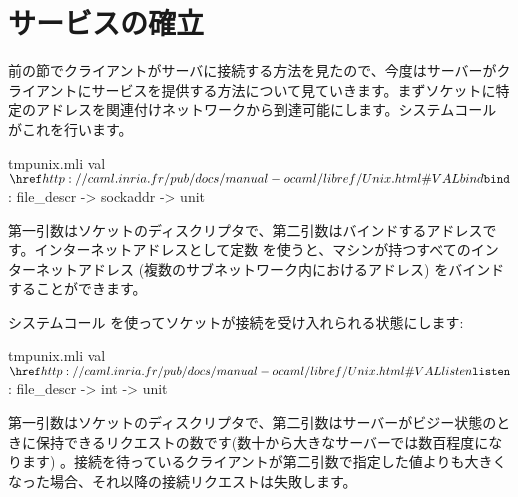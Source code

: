 \section{\label{sec/service}サービスの確立}

前の節でクライアントがサーバに接続する方法を見たので、今度はサーバーがクライアントにサービスを提供する方法について見ていきます。まずソケットに特定のアドレスを関連付けネットワークから到達可能にします。システムコール  がこれを行います。
%
\begin{listingcodefile}{tmpunix.mli}
val $\libvalue{Unix}{bind}$ : file_descr -> sockaddr -> unit
\end{listingcodefile}
%
第一引数はソケットのディスクリプタで、第二引数はバインドするアドレスです。インターネットアドレスとして定数  を使うと、マシンが持つすべてのインターネットアドレス (複数のサブネットワーク内におけるアドレス) をバインドすることができます。

システムコール  を使ってソケットが接続を受け入れられる状態にします:
%
\begin{listingcodefile}{tmpunix.mli}
val $\libvalue{Unix}{listen}$ : file_descr -> int -> unit
\end{listingcodefile}
%
第一引数はソケットのディスクリプタで、第二引数はサーバーがビジー状態のときに保持できるリクエストの数です(数十から大きなサーバーでは数百程度になります) 。接続を待っているクライアントが第二引数で指定した値よりも大きくなった場合、それ以降の接続リクエストは失敗します。

